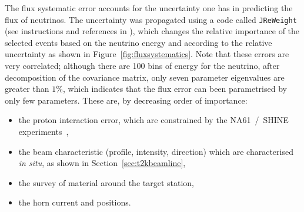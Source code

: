 
The flux systematic error accounts for the uncertainty one has in
predicting the flux of neutrinos. The uncertainty was propagated using
a code called \texttt{\Gls{JReWeight}} (see instructions and
references in \cite{t2kreweight}), which changes the relative
importance of the selected events based on the neutrino energy and
according to the relative uncertainty as shown in
Figure~\ref{fig:fluxsystematics}. Note that these errors are very
correlated; although there are 100 bins of energy for the neutrino,
after decomposition of the covariance matrix, only seven parameter
eigenvalues are greater than $1\%$, which indicates that the flux
error can been parametrised by only few parameters. These are, by
decreasing order of importance:
\begin{itemize}[noitemsep,topsep=0pt]
\item the proton interaction error, which are constrained by the
  NA61~/~SHINE
  experiments~\cite{Abgrall:2011ae,Abgrall:2011ts,Abgrall:2015hmv},
\item the beam characteristic (profile, intensity, direction) which
  are characterised {\it in situ}, as shown in
  Section~\ref{sec:t2kbeamline},
\item the survey of material around the target station,
\item the horn current and positions.
\end{itemize}

